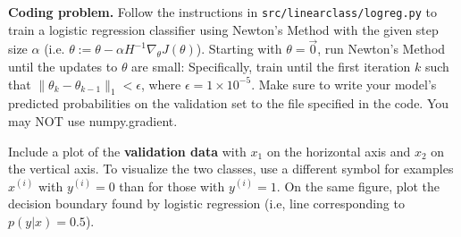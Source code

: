 \item {} \textbf{Coding problem.}
Follow the instructions in \texttt{src/linearclass/logreg.py} to train a
logistic regression classifier using Newton's Method with the given step size $\alpha$ (i.e. $\theta := \theta - \alpha H^{-1} \nabla_\theta J(\theta)$).
Starting with $\theta = \vec{0}$, run Newton's Method until the updates to
$\theta$ are small: Specifically,  train until the first iteration $k$ such
that $\|\theta_{k} - \theta_{k-1}\|_1 < \epsilon$, where
$\epsilon = 1\times 10^{-5}$. Make sure to write your model's predicted probabilities on
the validation set to the file specified in the code.
You may NOT use numpy.gradient.

Include a plot of the \textbf{validation data} with $x_1$ on the horizontal axis and $x_2$ on the vertical axis.
To visualize the two classes, use a different symbol for examples $x^{(i)}$
with $y^{(i)} = 0$ than for those with $y^{(i)} = 1$. On the same figure, plot the decision boundary
found by logistic regression (i.e, line corresponding to $p(y|x) = 0.5$).

